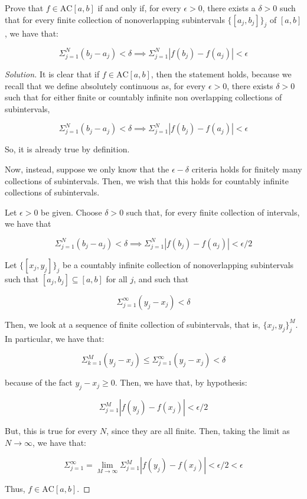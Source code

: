 \documentclass[10pt]{article}
\newcommand{\ac}{{\text{AC}}}
\newenvironment{problem}[2][Problem]{\begin{trivlist}
\item[\hskip \labelsep {\bfseries #1}\hskip \labelsep {\bfseries #2.}]}{\end{trivlist}}
\begin{document}
\begin{problem}{6.1.9}

Prove that $f \in \text{AC}[a,b]$ if and only if, for every $\epsilon > 0$, there exists a $\delta > 0$ such that for every finite collection of nonoverlapping subintervals $\{ [a_j,b_j] \}_j$ of $[a,b]$, we have that:

$$ \Sigma_{j=1}^N (b_j - a_j) < \delta \implies \Sigma_{j=1}^N |f(b_j) - f(a_j)| < \epsilon $$


\end{problem}
\begin{proof}[Solution]

It is clear that if $f \in \ac[a,b]$, then the statement holds, because we recall that we define absolutely continuous as, for every $\epsilon > 0$, there exists $\delta > 0$ such that for either finite or countably infinite non overlapping collections of subintervals,

$$ \Sigma_{j=1}^N (b_j - a_j) < \delta \implies \Sigma_{j=1}^N |f(b_j) - f(a_j)| < \epsilon $$

So, it is already true by definition.

Now, instead, suppose we only know that the $\epsilon-\delta$ criteria holds for finitely many collections of subintervals. Then, we wish that this holds for countably infinite collections of subintervals.

Let $\epsilon > 0$ be given. Choose $\delta > 0$ such that, for every finite collection of intervals, we have that

$$ \Sigma_{j=1}^N (b_j - a_j) < \delta \implies \Sigma_{j=1}^N |f(b_j) - f(a_j)| < \epsilon/2 $$

Let $\{ [x_j,y_j] \}_j$ be a countably infinite collection of nonoverlapping subintervals such that $[a_j,b_j] \subseteq [a,b]$ for all $j$, and such that

$$ \Sigma_{j=1}^\infty (y_j - x_j) < \delta $$

Then, we look at a sequence of finite collection of subintervals, that is, $\{ x_j,y_j \}_j^M$. In particular, we have that:

$$ \Sigma_{k=1}^M (y_j - x_j) \leq \Sigma_{j=1}^\infty (y_j - x_j) < \delta $$

because of the fact $y_j - x_j \geq 0$. Then, we have that, by hypothesis:

$$  \Sigma_{j=1}^M |f(y_j) - f(x_j)| < \epsilon/2 $$

But, this is true for every $N$, since they are all finite. Then, taking the limit as $N \to \infty$, we have that:

$$ \Sigma_{j=1}^\infty = \lim_{M \to \infty} \Sigma_{j=1}^M  |f(y_j) - f(x_j)| < \epsilon/2 < \epsilon $$

Thus, $f \in \ac[a,b]$. 

\end{proof}
\end{document}
